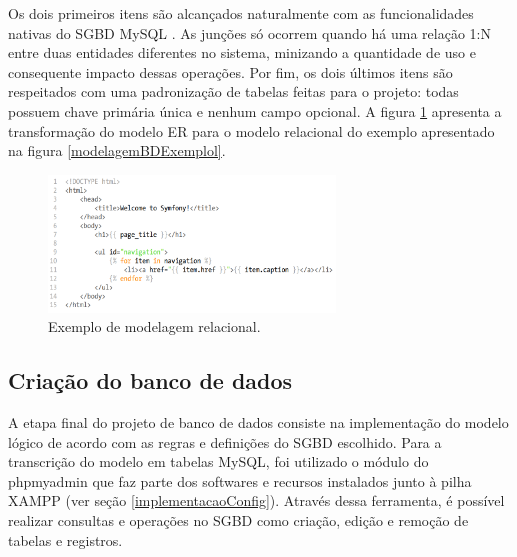 \documentclass[cic,tc]{iiufrgs}
\begin{document}
Os dois primeiros itens são alcançados naturalmente com as funcionalidades nativas do SGBD MySQL \cite{sqlCompleteBook}. As junções só ocorrem quando há uma relação 1:N entre duas entidades diferentes no sistema, minizando a quantidade de uso e consequente impacto dessas operações. Por fim, os dois últimos itens são respeitados com uma padronização de tabelas feitas para o projeto: todas possuem chave primária única e nenhum campo opcional. A figura \ref{modelagemBDLogicoExemplol} apresenta a transformação do modelo ER para o modelo relacional do exemplo apresentado na figura \ref{modelagemBDExemplol}.

\begin{figure}[h]
    \caption{Exemplo de modelagem relacional.}
       	\begin{center}
            \includegraphics[width=0.68\textwidth]{figuras/twig-symf.png}
        \end{center}
    \label{modelagemBDLogicoExemplol}
\end{figure}

\subsection{Criação do banco de dados}
\label{BDCriacao}

A etapa final do projeto de banco de dados consiste na implementação do modelo lógico de acordo com as regras e definições do SGBD escolhido. Para a transcrição do modelo em tabelas MySQL, foi utilizado o módulo do phpmyadmin que faz parte dos softwares e recursos instalados junto à pilha XAMPP (ver seção \ref{implementacaoConfig}). Através dessa ferramenta, é possível realizar consultas e  operações no SGBD como criação, edição e remoção de tabelas e registros.
\end{document}
